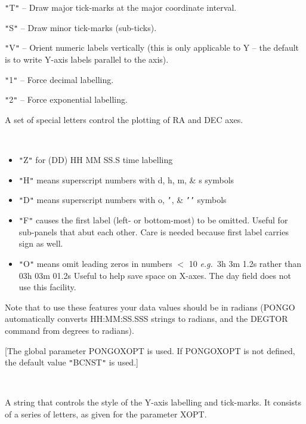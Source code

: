 \documentclass[twoside,11pt]{article}
\renewcommand{\_}{\texttt{\symbol{95}}}
\newcommand{\eg}{{\em e.g.\ }}
\newcommand{\sstsubsection}[1]{ \item[{#1}] \mbox{} \\}
\newcommand{\sstitemlist}[1]{
  \mbox{} \\
  \vspace{-3.5ex}
  \begin{itemize}
     #1
  \end{itemize}
}
\newcommand{\sstitem}{\item}
\newcommand{\sstsubsection}[1]{\item[{#1}]}
\newcommand{\sstitemlist}[1]{
      \begin{itemize}
         #1
      \end{itemize}
      \\
   }
\newcommand{\sstitem}{\item}
\begin{document}
\begin{sloppypar}
{{{{            \sstitem
               {\tt "}T{\tt "} -- Draw major tick-marks at the major coordinate
               interval.

            \sstitem
               {\tt "}S{\tt "} -- Draw minor tick-marks (sub-ticks).

            \sstitem
               {\tt "}V{\tt "} -- Orient numeric labels vertically (this is only
               applicable to Y -- the default is to write Y-axis labels
               parallel to the axis).

            \sstitem
               {\tt "}1{\tt "} -- Force decimal labelling.

            \sstitem
               {\tt "}2{\tt "} -- Force exponential labelling.

         }
         A set of special letters control the plotting of RA and DEC
         axes.

         \sstitemlist{

            \sstitem
               {\tt "}Z{\tt "} for (DD) HH MM SS.S time labelling

            \sstitem
               {\tt "}H{\tt "} means superscript numbers with d, h, m, \& s  symbols

            \sstitem
               {\tt "}D{\tt "} means superscript numbers with    o, {\tt '}, \& {\tt '}{\tt '} symbols

            \sstitem
               {\tt "}F{\tt "} causes the first label (left- or bottom-most) to
                     be omitted. Useful for sub-panels that abut each other.
                     Care is needed because first label carries sign as well.

            \sstitem
               {\tt "}O{\tt "} means omit leading zeros in numbers $<$ 10
                     \eg  3h 3m 1.2s rather than 03h 03m 01.2s  Useful
                     to help save space on X-axes. The day field does not
                     use this facility.

         }
         Note that to use these features your data values should be in
         radians (PONGO automatically converts HH:MM:SS.SSS strings to
         radians, and the DEGTOR command from degrees to radians).

         [The global parameter PONGO\_XOPT is used. If PONGO\_XOPT is not
         defined, the default value {\tt "}BCNST{\tt "} is used.]
      }
      \sstsubsection{
         YOPT = \_CHAR (Read and Write)
      }{
         A string that controls the style of the Y-axis labelling and
         tick-marks. It consists of a series of letters, as given for
         the parameter XOPT.

}}}
\end{sloppypar}
\end{document}
